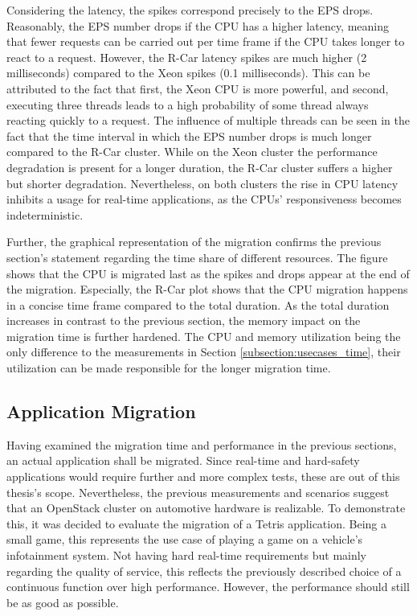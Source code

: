             \noindent Considering the latency, the spikes correspond precisely to the \ac{EPS} drops.
            Reasonably, the EPS number drops if the CPU has a higher latency, meaning that fewer requests can be carried out per time frame if the CPU takes longer to react to a request.
            However, the R-Car latency spikes are much higher (2 milliseconds) compared to the Xeon spikes (0.1 milliseconds).
            This can be attributed to the fact that first, the Xeon \ac{CPU} is more powerful, and second, executing three threads leads to a high probability of some thread always reacting quickly to a request.
            The influence of multiple threads can be seen in the fact that the time interval in which the \ac{EPS} number drops is much longer compared to the R-Car cluster.
            While on the Xeon cluster the performance degradation is present for a longer duration, the R-Car cluster suffers a higher but shorter degradation.
            Nevertheless, on both clusters the rise in \ac{CPU} latency inhibits a usage for real-time applications, as the CPUs' responsiveness becomes indeterministic. 
            
            \noindent Further, the graphical representation of the migration confirms the previous section's statement regarding the time share of different resources.
            The figure shows that the \ac{CPU} is migrated last as the spikes and drops appear at the end of the migration.
            Especially, the R-Car plot shows that the \ac{CPU} migration happens in a concise time frame compared to the total duration. 
            As the total duration increases in contrast to the previous section, the memory impact on the migration time is further hardened.
            The CPU and memory utilization being the only difference to the measurements in Section \ref{subsection:usecases_time}, their utilization can be made responsible for the longer migration time.
            
    
    \subsection{Application Migration}
    \label{section:usecases_application}
        
        Having examined the migration time and performance in the previous sections, an actual application shall be migrated.        
        Since real-time and hard-safety applications would require further and more complex tests, these are out of this thesis's scope.
        Nevertheless, the previous measurements and scenarios suggest that an OpenStack cluster on automotive hardware is realizable.
        To demonstrate this, it was decided to evaluate the migration of a Tetris application.
        Being a small game, this represents the use case of playing a game on a vehicle's infotainment system.
        Not having hard real-time requirements but mainly regarding the quality of service, this reflects the previously described choice of a continuous function over high performance.
        However, the performance should still be as good as possible.

